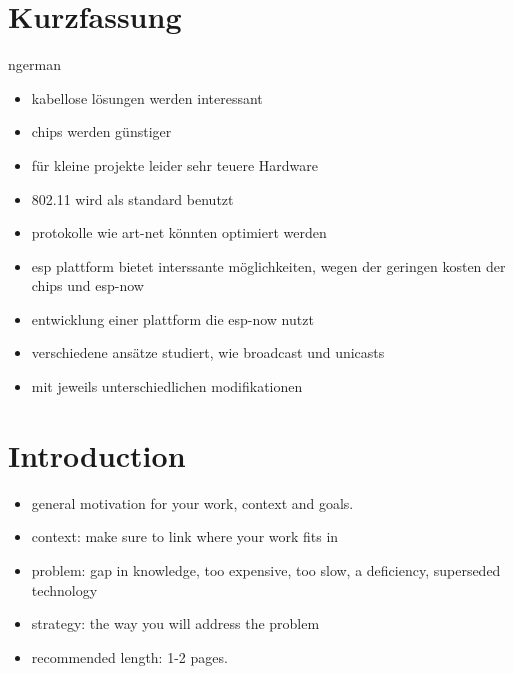 \documentclass[]{ccs-thesis}
\begin{document}
\chapter*{Kurzfassung}
\begin{otherlanguage*}{ngerman}
\begin{itemize}
	\item kabellose lösungen werden interessant
	\item chips werden günstiger
	\item für kleine projekte leider sehr teuere Hardware
	\item 802.11 wird als standard benutzt
	\item protokolle wie art-net könnten optimiert werden
	\item esp plattform bietet interssante möglichkeiten, wegen der geringen kosten der chips und esp-now
	\item entwicklung einer plattform die esp-now nutzt
	\item verschiedene ansätze studiert, wie broadcast und unicasts
	\item mit jeweils unterschiedlichen modifikationen
\end{itemize}


\end{otherlanguage*}
\acresetall

\cleardoublepage
\tableofcontents
{}

\cleardoublepage
{}



\chapter{Introduction}

\begin{itemize}
\item general motivation for your work, context and goals.
\item context: make sure to link where your work fits in
\item problem: gap in knowledge, too expensive, too slow, a deficiency, superseded technology
\item strategy: the way you will address the problem
\item recommended length: 1-2 pages.
\end{itemize}
\end{document}
